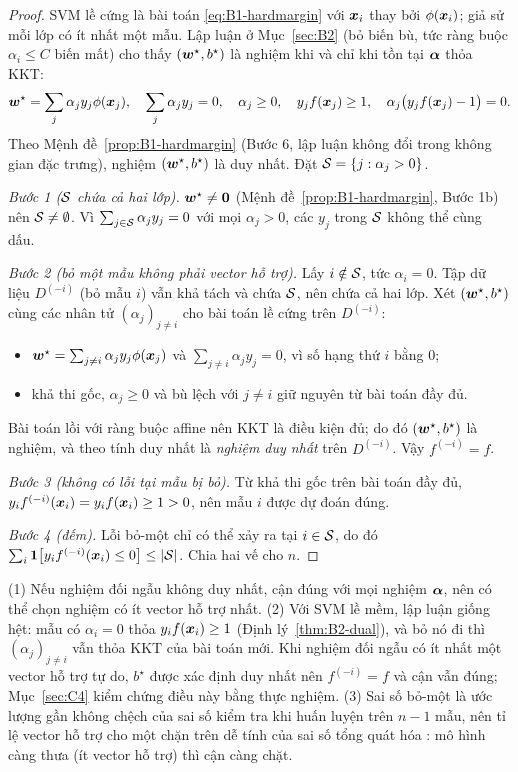\begin{proof}
SVM lề cứng là bài toán \eqref{eq:B1-hardmargin} với $\bm{x}_i$ thay bởi $\phi(\bm{x}_i)$; giả sử mỗi lớp
có ít nhất một mẫu. Lập luận ở Mục~\ref{sec:B2} (bỏ biến bù, tức ràng buộc $\alpha_i \le C$ biến mất)
cho thấy $(\bm{w}^\star, b^\star)$ là nghiệm khi và chỉ khi tồn tại $\bm{\alpha}$ thỏa KKT:
\[
  \bm{w}^\star = \sum_j \alpha_j y_j \phi(\bm{x}_j), \quad \sum_j \alpha_j y_j = 0, \quad \alpha_j \ge 0, \quad
  y_j f(\bm{x}_j) \ge 1, \quad \alpha_j\bigl(y_j f(\bm{x}_j) - 1\bigr) = 0 .
\]
Theo Mệnh đề~\ref{prop:B1-hardmargin} (Bước 6, lập luận không đổi trong không gian đặc trưng),
nghiệm $(\bm{w}^\star, b^\star)$ là duy nhất. Đặt $\mathcal{S} = \{j : \alpha_j > 0\}$.

\emph{Bước 1 ($\mathcal{S}$ chứa cả hai lớp).} $\bm{w}^\star \ne \bm{0}$ (Mệnh đề~\ref{prop:B1-hardmargin}, Bước 1b)
nên $\mathcal{S} \ne \emptyset$. Vì $\sum_{j \in \mathcal{S}} \alpha_j y_j = 0$ với mọi $\alpha_j > 0$, các $y_j$
trong $\mathcal{S}$ không thể cùng dấu.

\emph{Bước 2 (bỏ một mẫu không phải vector hỗ trợ).} Lấy $i \notin \mathcal{S}$, tức $\alpha_i = 0$. Tập dữ liệu
$D^{(-i)}$ (bỏ mẫu $i$) vẫn khả tách và chứa $\mathcal{S}$, nên chứa cả hai lớp. Xét $(\bm{w}^\star, b^\star)$
cùng các nhân tử $(\alpha_j)_{j \ne i}$ cho bài toán lề cứng trên $D^{(-i)}$:
\begin{itemize}
  \item $\bm{w}^\star = \sum_{j \ne i} \alpha_j y_j \phi(\bm{x}_j)$ và $\sum_{j \ne i}\alpha_j y_j = 0$,
        vì số hạng thứ $i$ bằng $0$;
  \item khả thi gốc, $\alpha_j \ge 0$ và bù lệch với $j \ne i$ giữ nguyên từ bài toán đầy đủ.
\end{itemize}
Bài toán lồi với ràng buộc affine nên KKT là điều kiện đủ; do đó $(\bm{w}^\star, b^\star)$ là nghiệm, và
theo tính duy nhất là \emph{nghiệm duy nhất} trên $D^{(-i)}$. Vậy $f^{(-i)} = f$.

\emph{Bước 3 (không có lỗi tại mẫu bị bỏ).} Từ khả thi gốc trên bài toán đầy đủ,
$y_i f^{(-i)}(\bm{x}_i) = y_i f(\bm{x}_i) \ge 1 > 0$, nên mẫu $i$ được dự đoán đúng.

\emph{Bước 4 (đếm).} Lỗi bỏ-một chỉ có thể xảy ra tại $i \in \mathcal{S}$, do đó
$\sum_i \mathbf{1}\!\left[y_i f^{(-i)}(\bm{x}_i) \le 0\right] \le \left\lvert \mathcal{S} \right\rvert$. Chia hai vế cho $n$.
\end{proof}

\begin{remark}\label{rem:B6-soft}
(1) Nếu nghiệm đối ngẫu không duy nhất, cận đúng với mọi nghiệm $\bm{\alpha}$, nên có thể chọn nghiệm
có ít vector hỗ trợ nhất. (2) Với SVM lề mềm, lập luận giống hệt: mẫu có $\alpha_i = 0$ thỏa
$y_i f(\bm{x}_i) \ge 1$ (Định lý~\ref{thm:B2-dual}), và bỏ nó đi thì $(\alpha_j)_{j \ne i}$ vẫn thỏa KKT
của bài toán mới. Khi nghiệm đối ngẫu có ít nhất một vector hỗ trợ tự do, $b^\star$ được xác định
duy nhất nên $f^{(-i)} = f$ và cận vẫn đúng; Mục~\ref{sec:C4} kiểm chứng điều này bằng thực nghiệm.
(3) Sai số bỏ-một là ước lượng gần không chệch của sai số kiểm tra khi huấn luyện trên $n - 1$ mẫu,
nên tỉ lệ vector hỗ trợ cho một chặn trên dễ tính của sai số tổng quát hóa \citep{vapnik1995nature}:
mô hình càng thưa (ít vector hỗ trợ) thì cận càng chặt.
\end{remark}
